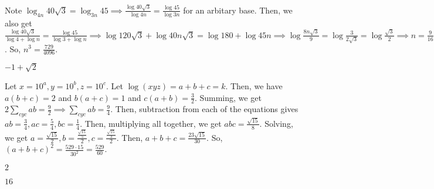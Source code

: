 \documentclass[11pt]{article}
\begin{document}
\begin{sol}
Note $\log_{4n} 40\sqrt{3} = \log_{3n} 45\implies \frac{\log 40\sqrt{3}}{\log 4n} = \frac{\log 45}{\log 3n}$ for an arbitary base. Then, we also get $\frac{\log 40\sqrt{3}}{\log 4 + \log n} = \frac{\log 45}{\log 3 + \log n}\implies \log 120\sqrt{3} + \log 40n\sqrt{3} = \log 180 + \log 45n \implies \log \frac{8n\sqrt{3}}{9} = \log \frac{3}{2\sqrt{3}}= \log \frac{\sqrt{3}}{2}\implies n = \frac{9}{16}$. So, $n^3=\boxed{\frac{729}{4096}}$.
\end{sol}


\begin{sol}
$\boxed{-1+\sqrt{2}}$
\end{sol}


\begin{sol}
Let $x=10^{a}, y=10^{b}, z = 10^{c}$. Let $\log(xyz)=a+b+c=k$. Then, we have $a(b+c)=2$ and $b(a+c)=1$ and $c(a+b)=\frac{3}{2}$. Summing, we get $2\sum_{cyc} ab = \frac{9}{2}\implies \sum_{cyc} ab =\frac{9}{4}$. Then, subtraction from each of the equations gives $ab=\frac{3}{4}, ac=\frac{5}{4},bc=\frac{1}{4}$. Then, multiplying all together, we get $abc=\frac{\sqrt{15}}{8}$. Solving, we get $a=\frac{\sqrt{15}}{2}, b= \frac{\frac{\sqrt{15}}{5}}{2}, c=\frac{\frac{\sqrt{15}}{3}}{2}$. Then, $a+b+c=\frac{23\sqrt{15}}{30}$. So, $(a+b+c)^2=\frac{529\cdot 15}{30^2}=\boxed{\frac{529}{60}}$.
\end{sol}


\begin{sol}
$\boxed{2}$
\end{sol}


\begin{sol}
$\boxed{16}$
\end{sol}
\end{document}

